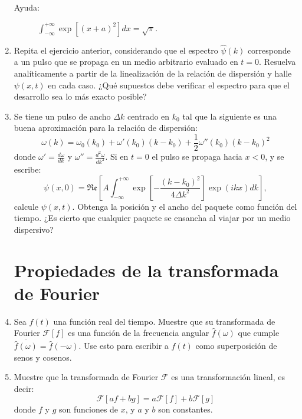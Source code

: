 \documentclass[11pt,spanish]{article}
\begin{document}
\begin{enumerate}
\begin{enumerate}
    \end{enumerate}

    \begin{description}
        \item [{Ayuda:}] $\int_{-\infty}^{+\infty}\exp\left[(x+a)^{2}\right]dx=\sqrt{\pi}$.
    \end{description}


    \item Repita el ejercicio anterior, considerando que el espectro
    $\hat{\psi}(k)$ corresponde a un pulso que se propaga en un medio arbitrario
    evaluado en $t=0$. Resuelva analíticamente a partir de la linealización de
    la relación de dispersión y halle $\psi(x,t)$ en cada caso. ¿Qué supuestos
    debe verificar el espectro para que el desarrollo sea lo más exacto posible?


    \item Se tiene un pulso de ancho $\Delta k$ centrado en $k_{0}$ tal que
    la siguiente es una buena aproximación para la relación de dispersión:
    \[
    \omega(k)=\omega_{0}(k_{0})+\omega'(k_{0})(k-k_{0})+\frac{1}{2}\omega''(k_{0})(k-k_{0})^{2}
    \]
    donde $\omega' = \frac{d \omega}{dk}$ y $\omega'' = \frac{d^2 \omega}{dk^2}$.
    Si en $t=0$ el pulso se propaga hacia $x<0$, y se escribe:
    \[
    \psi(x,0)=\mathfrak{Re}\left[ A\int_{-\infty}^{+\infty}\exp\left[-\frac{(k-k_{0})^{2}}{4\Delta k^{2}}\right]\exp\left(ikx\right)dk\right],
    \]
    calcule $\psi(x,t)$. Obtenga la posición y el ancho del paquete
    como función del tiempo. ¿Es cierto que cualquier paquete se ensancha al
    viajar por un medio dispersivo?


\section*{Propiedades de la transformada de Fourier}    
    
    
    \item Sea $f(t)$ una función real del tiempo. Muestre que su transformada de
    Fourier $\mathcal{F}[f]$ es una función de la frecuencia angular
    $\hat{f}(\omega)$ que cumple $\overline{\hat{f}(\omega)}=\hat{f}(-\omega)$.
    Use esto para escribir a $f(t)$ como superposición de senos y cosenos.


    \item Muestre que la transformada de Fourier $\mathcal{F}$ es una
    transformación lineal, es decir:
    \[
    \mathcal{F}[af+bg]=a\mathcal{F}[f]+b\mathcal{F}[g]
    \]
    donde $f$ y $g$ son funciones de $x$, y $a$ y $b$ son constantes.



\end{enumerate}
\end{document}
